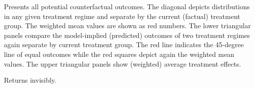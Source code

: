 %
\begin{Details}
Presents all potential counterfactual outcomes. The diagonal depicts
distributions in any given treatment regime and separate by the current
(factual) treatment group. The weighted mean values are shown as red numbers.
The lower triangular panels compare the model-implied (predicted) outcomes
of two treatment regimes again separate by current treatment group. The red
line indicates the 45-degree line of equal outcomes while the red squares
depict again the weighted mean values. The upper triangular panels show
(weighted) average treatment effects.
\end{Details}
%
\begin{Value}
Returns  invisibly.
\end{Value}
%
\begin{SeeAlso}
\end{SeeAlso}
%
\begin{Examples}
\end{Examples}


